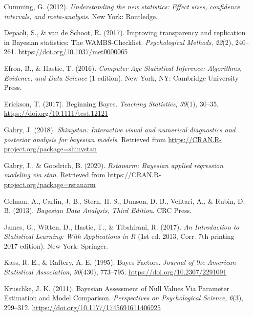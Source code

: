 \documentclass[
  english,
  doc]{apa6}
\newlength{\cslhangindent}
\newenvironment{cslreferences}%
  {\setlength{\parindent}{0pt}%
  \everypar{\setlength{\hangindent}{\cslhangindent}}\ignorespaces}%
  {\par}
\begin{document}
\begin{cslreferences}
\leavevmode\hypertarget{ref-CummingUnderstandingnewstatistics2012}{}%
Cumming, G. (2012). \emph{Understanding the new statistics: Effect sizes, confidence intervals, and meta-analysis}. New York: Routledge.

\leavevmode\hypertarget{ref-depaoliImprovingTransparencyReplication2017}{}%
Depaoli, S., \& van de Schoot, R. (2017). Improving transparency and replication in Bayesian statistics: The WAMBS-Checklist. \emph{Psychological Methods}, \emph{22}(2), 240--261. \url{https://doi.org/10.1037/met0000065}

\leavevmode\hypertarget{ref-efronComputerAgeStatistical2016}{}%
Efron, B., \& Hastie, T. (2016). \emph{Computer Age Statistical Inference: Algorithms, Evidence, and Data Science} (1 edition). New York, NY: Cambridge University Press.

\leavevmode\hypertarget{ref-EricksonBeginningBayes2017}{}%
Erickson, T. (2017). Beginning Bayes. \emph{Teaching Statistics}, \emph{39}(1), 30--35. \url{https://doi.org/10.1111/test.12121}

\leavevmode\hypertarget{ref-R-shinystan}{}%
Gabry, J. (2018). \emph{Shinystan: Interactive visual and numerical diagnostics and posterior analysis for bayesian models}. Retrieved from \url{https://CRAN.R-project.org/package=shinystan}

\leavevmode\hypertarget{ref-R-rstanarm}{}%
Gabry, J., \& Goodrich, B. (2020). \emph{Rstanarm: Bayesian applied regression modeling via stan}. Retrieved from \url{https://CRAN.R-project.org/package=rstanarm}

\leavevmode\hypertarget{ref-GelmanBayesianDataAnalysis2013}{}%
Gelman, A., Carlin, J. B., Stern, H. S., Dunson, D. B., Vehtari, A., \& Rubin, D. B. (2013). \emph{Bayesian Data Analysis, Third Edition}. CRC Press.

\leavevmode\hypertarget{ref-JamesIntroductionStatisticalLearning2017}{}%
James, G., Witten, D., Hastie, T., \& Tibshirani, R. (2017). \emph{An Introduction to Statistical Learning: With Applications in R} (1st ed. 2013, Corr. 7th printing 2017 edition). New York: Springer.

\leavevmode\hypertarget{ref-kassBayesFactors1995}{}%
Kass, R. E., \& Raftery, A. E. (1995). Bayes Factors. \emph{Journal of the American Statistical Association}, \emph{90}(430), 773--795. \url{https://doi.org/10.2307/2291091}

\leavevmode\hypertarget{ref-kruschkeBayesianAssessmentNull2011}{}%
Kruschke, J. K. (2011). Bayesian Assessment of Null Values Via Parameter Estimation and Model Comparison. \emph{Perspectives on Psychological Science}, \emph{6}(3), 299--312. \url{https://doi.org/10.1177/1745691611406925}


\end{cslreferences}
\end{document}

